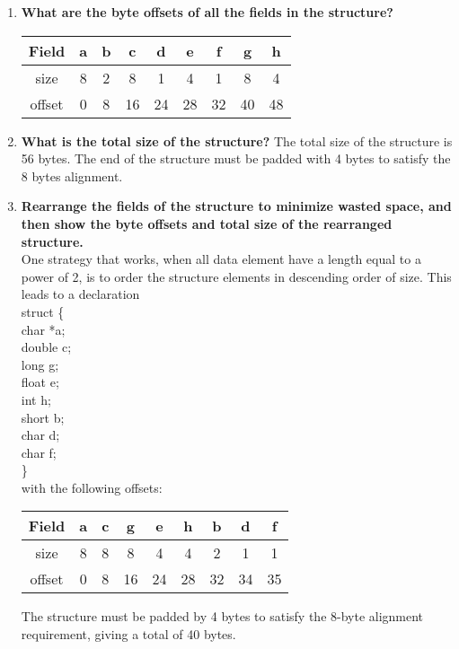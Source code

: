 \documentclass{article}
\begin{document}
\begin{enumerate}[label=\textbf{\Alph*.}]
	\item \textbf{What are the byte offsets of all the fields in the structure?}
	\begin{tabular}{c c c c c c c c c}
		Field & a & b & c & d & e & f & g & h \\
		\hline
		size & 8 & 2 & 8 & 1 & 4 & 1 & 8 & 4 \\
		offset & 0 & 8 & 16 & 24 & 28 & 32 & 40 & 48 \\
	\end{tabular}
	\item \textbf{What is the total size of the structure?}
	The total size of the structure is 56 bytes. The end of the structure must be padded
	with 4 bytes to satisfy the 8 bytes alignment.
	\item \textbf{Rearrange the fields of the structure to minimize wasted space,
	and then show the byte offsets and total size of the rearranged structure.} \\
	One strategy that works, when all data element have a length equal to a power of 2,	
	is to order the structure elements in descending order of size. This leads to a
	declaration \\
	struct \{ \\
		char *a; \\
		double c; \\
		long g; \\
		float e; \\
		int h; \\
		short b; \\
		char d; \\
		char f; \\
	\} \\
	with the following offsets:
	\begin{tabular}{c c c c c c c c c}
		Field & a & c & g & e & h & b & d & f \\
		\hline
		size & 8 & 8 & 8 & 4 & 4 & 2 & 1 & 1 \\
		offset & 0 & 8 & 16 & 24 & 28 & 32 & 34 & 35 \\
	\end{tabular}
	The structure must be padded by 4 bytes to satisfy the 8-byte alignment requirement,
	giving a total of 40 bytes.
\end{enumerate}
\end{document}
